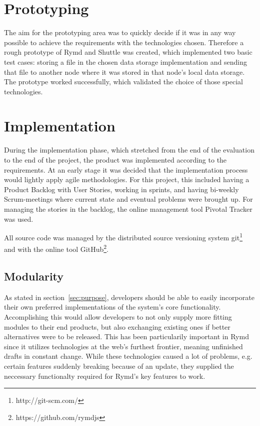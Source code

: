 \section{Prototyping}

The aim for the prototyping area was to quickly decide if it was in any way possible to achieve the requirements with the technologies chosen. Therefore a rough prototype of Rymd and Shuttle was created, which implemented two basic test cases: storing a file in the chosen data storage implementation and sending that file to another node where it was stored in that node's local data storage. The prototype worked successfully, which validated the choice of those special technologies.

\section{Implementation}

During the implementation phase, which stretched from the end of the evaluation to the end of the project, the product was implemented according to the requirements. At an early stage it was decided that the implementation process would lightly apply agile methodologies. For this project, this included having a Product Backlog with User Stories, working in sprints, and having bi-weekly Scrum-meetings where current state and eventual problems were brought up. For managing the stories in the backlog, the online management tool Pivotal Tracker was used.

All source code was managed by the distributed source versioning system git\footnote{http://git-scm.com/} and with the online tool GitHub\footnote{https://github.com/rymdjs}.

\subsection{Modularity}

As stated in section~\ref{sec:purpose}, developers should be able to easily incorporate their own preferred implementations of the system's core functionality. Accomplishing this would allow developers to not only supply more fitting modules to their end products, but also exchanging existing ones if better alternatives were to be released. This has been particularily important in Rymd since it utilizes technologies at the web's furthest frontier, meaning unfinished drafts in constant change. While these technologies caused a lot of problems, e.g. certain features suddenly breaking because of an update, they supplied the neccessary functionalty required for Rymd's key features to work.

